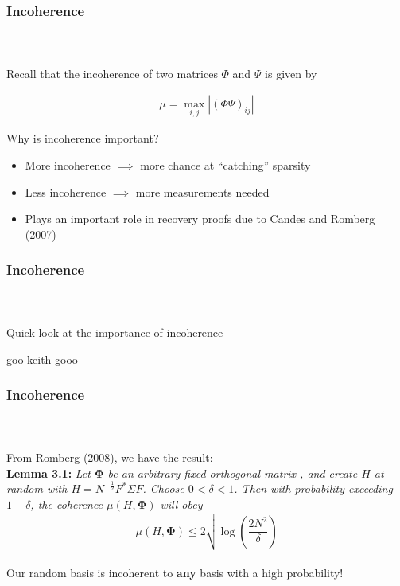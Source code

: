 
\begin{frame}[t]
\frametitle{Incoherence}
\framesubtitle{~~}  %

Recall that the incoherence of two matrices $\Phi$ and $\Psi$ is given by 

\begin{align}
	\mu = \max_{i,j} |(\Phi \Psi)_{ij}|
	\label{incoherence}
\end{align}

Why is incoherence important?

\begin{itemize}
	\item More incoherence $\implies$ more chance at ``catching'' sparsity
	\item Less incoherence $\implies$ more measurements needed
	\item Plays an important role in recovery proofs due to Candes and Romberg (2007)
\end{itemize}
\end{frame}

\begin{frame}[t]
\frametitle{Incoherence}
\framesubtitle{~~}  %
Quick look at the importance of incoherence

goo keith gooo

\end{frame}

\begin{frame}[t]
\frametitle{Incoherence}
\framesubtitle{~~}  %

From Romberg (2008), we have the result:\\

\textbf{Lemma 3.1:} \textit{Let $\boldsymbol{\Phi}$ be an arbitrary fixed orthogonal matrix
, and create $H$ at random with $H = N^{-\frac{1}{2}} F^* \Sigma F$. Choose $0<\delta<1$.
Then with probability exceeding $1-\delta$, the coherence $\mu(H,\boldsymbol{\Phi})$ 
will obey} \\
\begin{equation}
	\mu(H,\boldsymbol{\Phi}) \leq 2 \sqrt{\log \left(\frac{2N^2}{\delta} \right)}
	\label{incoherence_bd1}
\end{equation}
\\
Our random basis is incoherent to \textbf{any} basis with a high probability!

\end{frame}



